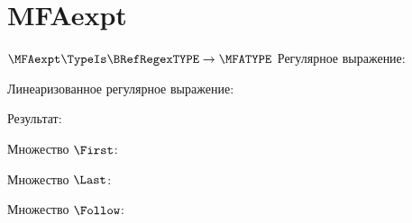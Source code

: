 \section{MFAexpt}
\begin{frame}{$\MFAexpt\TypeIs\BRefRegexTYPE\to\MFATYPE$}
	Регулярное выражение:

	Линеаризованное регулярное выражение:

	Результат:

    Множество $\First$:


    Множество $\Last$:


    Множество $\Follow$:


\end{frame}